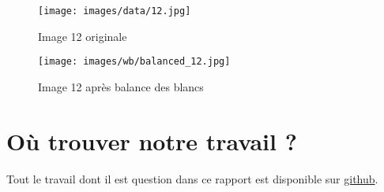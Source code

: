 \documentclass[12pt]{article}
\begin{document}
\begin{figure}[H]
    \centering
    \begin{minipage}{0.48\textwidth}
        \centering
        \texttt{[image: images/data/12.jpg]}
        \caption{Image 12 originale}
    \end{minipage}
    \hfill
    \begin{minipage}{0.48\textwidth}
        \centering
        \texttt{[image: images/wb/balanced\_12.jpg]}
        \caption{Image 12 après balance des blancs}
    \end{minipage}
\end{figure}

\clearpage

\section{Où trouver notre travail ?}

Tout le travail dont il est question dans ce rapport est disponible sur \href{https://github.com/antoinedenovembre/colorimetry_project_2}{github}.
\end{document}
